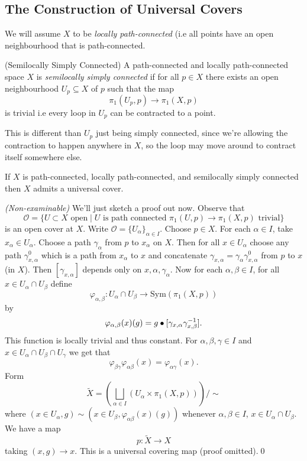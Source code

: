 \documentclass{article}
\begin{document}
\subsection{The Construction of Universal Covers}
We will assume $ X $ to be \textit{locally path-connected} (i.e all points have an open neighbourhood that is path-connected.
\begin{definition}
	(Semilocally Simply Connected) A path-connected and locally path-connected space $ X $ is \textit{semilocally simply connected} if for all $ p\in X $ there exists an open neighbourhood $ U_p \subseteq X $ of $ p $ such that the map
	\[
	  \pi_1(U_p,p) \to \pi_1(X,p)
	\]
	is trivial i.e every loop in $ U_p $ can be contracted to a point.
\end{definition}
\begin{remark}
  This is different than $ U_p $ just being simply connected, since we're allowing the contraction to happen anywhere in $ X $, so the loop may move around to contract itself somewhere else.
\end{remark}
\begin{theorem}
  If $ X $ is path-connected, locally path-connected, and semilocally simply connected then $ X $ admits a universal cover.
\end{theorem}
\pf \textit{(Non-examinable)} We'll just sketch a proof out now. Observe that
\[
	\mathcal O =\{ U \subset X \text{ open} \mid U \text{ is path connected } \pi_1(U,p) \to \pi_1(X,p) \text{ trivial}\}
\]
is an open cover at $ X $. Write $ \mathcal O = \{U_\alpha\}_{\alpha \in I} $. Choose $ p \in X $. For each $ \alpha \in I $, take $ x_\alpha\in U_\alpha $. Choose a path $ \gamma_\alpha $ from $ p $ to $ x_\alpha $ on $ X $. Then for all $ x\in U_\alpha $ choose any path $ \gamma_{x,\alpha}^0 $ which is a path from $ x_\alpha $ to $ x $ and concatenate $ \gamma_{x,\alpha} = \gamma_\alpha\gamma_{x,\alpha}^0 $ from $ p $ to $ x $ (in $ X $). Then $ [\gamma_{x,\alpha}] $ depends only on $ x,\alpha,\gamma_\alpha $. Now for each $ \alpha,\beta \in I $, for all $ x\in U_\alpha \cap U_\beta $ define
\[
	\varphi_{\alpha,\beta}: U_\alpha \cap U_\beta \to \mathrm{Sym}(\pi_1(X,p))
\]
by
\[
	\varphi_{\alpha,\beta}(x)(g) = g\bullet [\gamma_{x,\alpha}{\gamma}^{-1}_{x,\beta}].
\]
This function is locally trivial and thus constant. For $ \alpha,\beta,\gamma\in I $ and $ x\in U_\alpha \cap U_\beta \cap  U_\gamma $ we get that 
\[
	\varphi_{\beta\gamma} \varphi_{\alpha\beta}(x) = \varphi_{\alpha\gamma}(x).
\]
Form
\[
	\tilde X = \left(\bigsqcup_{\alpha \in I} (U_\alpha \times \pi_1(X,p))\right)/\sim
\]
where $ (x\in U_\alpha,g)\sim (x\in U_\beta, \varphi_{\alpha \beta}(x)(g)) $ whenever $ \alpha,\beta \in I $, $ x\in U_\alpha\cap U_\beta $. We have a map
\[
  p: \tilde X \to X 
\]
taking $ (x,g) \to x $. This is a universal covering map (proof omitted).\qed
\end{document}
